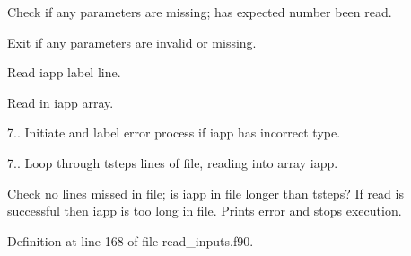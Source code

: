 \begin{DoxyEnumerate}
\item Check if any parameters are missing; has expected number been read.
\item Exit if any parameters are invalid or missing.
\item Read iapp label line.
\item Read in iapp array.
\end{DoxyEnumerate}

7.. Initiate and label error process if iapp has incorrect type.

7.. Loop through tsteps lines of file, reading into array iapp.


\begin{DoxyEnumerate}
\item Check no lines missed in file; is iapp in file longer than tsteps? If read is successful then iapp is too long in file. Prints error and stops execution. 
\end{DoxyEnumerate}

Definition at line 168 of file read\-\_\-inputs.\-f90.

